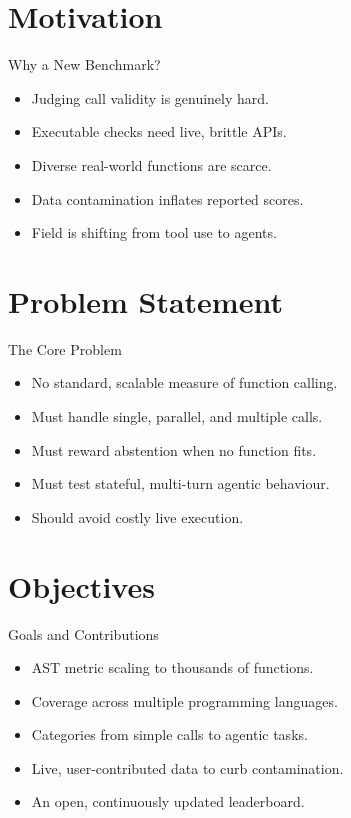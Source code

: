 \documentclass{beamer}
\begin{document}
\section{Motivation}
\begin{frame}{Why a New Benchmark?}
\begin{itemize}
\item Judging call validity is genuinely hard.
\item Executable checks need live, brittle APIs.
\item Diverse real-world functions are scarce.
\item Data contamination inflates reported scores.
\item Field is shifting from tool use to agents.
\end{itemize}
\end{frame}

\section{Problem Statement}
\begin{frame}{The Core Problem}
\begin{itemize}
\item No standard, scalable measure of function calling.
\item Must handle single, parallel, and multiple calls.
\item Must reward abstention when no function fits.
\item Must test stateful, multi-turn agentic behaviour.
\item Should avoid costly live execution.
\end{itemize}
\end{frame}

\section{Objectives}
\begin{frame}{Goals and Contributions}
\begin{itemize}
\item AST metric scaling to thousands of functions.
\item Coverage across multiple programming languages.
\item Categories from simple calls to agentic tasks.
\item Live, user-contributed data to curb contamination.
\item An open, continuously updated leaderboard.
\end{itemize}
\end{frame}
\end{document}
